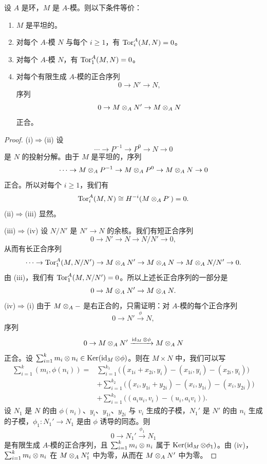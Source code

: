 \begin{proposition}\label{it:2.1.17}
设 $A$ 是环，$M$ 是 $A$-模。则以下条件等价：
\begin{enumerate}[label=(\roman*),leftmargin=2.4em]
  \item $M$ 是平坦的。
  \item 对每个 $A$-模 $N$ 与每个 $i\ge1$，有 $\operatorname{Tor}^A_i(M,N)=0$。
  \item 对每个 $A$-模 $N$，有 $\operatorname{Tor}^A_1(M,N)=0$。
  \item 对每个有限生成 $A$-模的正合序列
  \[
  0\to N'\to N,
  \]
  序列
  \[
  0\to M\otimes_A N'\to M\otimes_A N
  \]
  正合。
\end{enumerate}
\end{proposition}
\begin{proof}
(i)$\Rightarrow$(ii) 设
\[
\cdots\to P^{-1}\to P^0\to N\to 0
\]
是 $N$ 的投射分解。由于 $M$ 是平坦的，序列
\[
\cdots\to M\otimes_A P^{-1}\to M\otimes_A P^0\to M\otimes_A N\to 0
\]
正合。所以对每个 $i\ge1$，我们有
\[
\operatorname{Tor}_i^A(M,N)\cong H^{-i}(M\otimes_A P^\cdot)=0.
\]
(ii)$\Rightarrow$(iii) 显然。

(iii)$\Rightarrow$(iv) 设 $N/N'$ 是 $N'\to N$ 的余核。我们有短正合序列
\[
0\to N'\to N\to N/N'\to 0,
\]
从而有长正合序列
\[
\cdots\to\operatorname{Tor}_1^A(M,N/N')\to M\otimes_A N'\to M\otimes_A N\to M\otimes_A N/N'\to 0.
\]
由 (iii)，我们有 $\operatorname{Tor}_1^A(M,N/N')=0$。所以上述长正合序列的一部分是
\[
0\to M\otimes_A N'\to M\otimes_A N.
\]
(iv)$\Rightarrow$(i) 由于 $M\otimes_A-$ 是右正合的，只需证明：对 $A$-模的每个正合序列
\[
0\to N'\xrightarrow{\phi} N,
\]
序列
\[
0\to M\otimes_A N'\xrightarrow{\operatorname{id}_M\otimes\phi} M\otimes_A N
\]
正合。设 $\sum_{i=1}^k m_i\otimes n_i\in\operatorname{Ker}(\operatorname{id}_M\otimes\phi)$。则在 $M\times N$ 中，我们可以写
\[
\begin{aligned}
\sum_{i=1}^k(m_i,\phi(n_i))={}&\sum_{i=1}^{k_1}\bigl((x_{1i}+x_{2i},y_i)-(x_{1i},y_i)-(x_{2i},y_i)\bigr)\\
&+\sum_{i=1}^{k_2}\bigl((x_i,y_{1i}+y_{2i})-(x_i,y_{1i})-(x_i,y_{2i})\bigr)\\
&+\sum_{i=1}^{k_3}\bigl((a_iu_i,v_i)-(u_i,a_iv_i)\bigr).
\end{aligned}
\]
设 $N_1$ 是 $N$ 的由 $\phi(n_i)$、$y_i$、$y_{1i}$、$y_{2i}$ 与 $v_i$ 生成的子模，$N_1'$ 是 $N'$ 的由 $n_i$ 生成的子模，$\phi_1\colon N_1'\to N_1$ 是由 $\phi$ 诱导的同态。则
\[
0\to N_1'\xrightarrow{\phi_1}N_1
\]
是有限生成 $A$-模的正合序列，且 $\sum_{i=1}^k m_i\otimes n_i$ 属于 $\operatorname{Ker}(\operatorname{id}_M\otimes\phi_1)$。由 (iv)，$\sum_{i=1}^k m_i\otimes n_i$ 在 $M\otimes_A N_1'$ 中为零，从而在 $M\otimes_A N'$ 中为零。
\end{proof}

